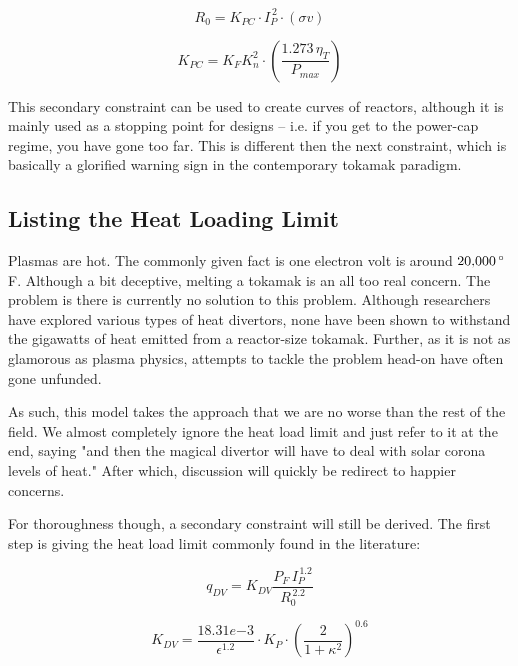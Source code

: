 \begin{equation}
	R_0 = K_{PC} \cdot I_P^{\,2} \cdot (\sigma v)
\end{equation}

\begin{equation}
	K_{PC} = K_F K_n^2 \cdot \left( \frac{ 1.273 \, \eta_T }{ P_{max} } \right)
\end{equation}

This secondary constraint can be used to create curves of reactors, although it is mainly used as a stopping point for designs -- i.e. if you get to the power-cap regime, you have gone too far. This is different then the next constraint, which is basically a glorified warning sign in the contemporary tokamak paradigm.

\subsection{Listing the Heat Loading Limit}

Plasmas are hot. The commonly given fact is one electron volt is around $20\textnormal{,}000 \, {}^\circ$F. Although a bit deceptive, melting a tokamak is an all too real concern. The problem is there is currently no solution to this problem. Although researchers have explored various types of heat divertors, none have been shown to withstand the gigawatts of heat emitted from a reactor-size tokamak. Further, as it is not as glamorous as plasma physics, attempts to tackle the problem head-on have often gone unfunded.

As such, this model takes the approach that we are no worse than the rest of the field. We almost completely ignore the heat load limit and just refer to it at the end, saying "and then the magical divertor will have to deal with solar corona levels of heat." After which, discussion will quickly be redirect to happier concerns.

For thoroughness though, a secondary constraint will still be derived. The first step is giving the heat load limit commonly found in the literature:

\begin{equation}
  q_{DV} = K_{DV}  \frac{ P_F \, I_P^{\,1.2} }{ R_0^{\,2.2} }
\end{equation}

\begin{equation}
	K_{DV} = \frac{18.31e{-3}}{\epsilon^{1.2}} \cdot K_P \cdot \left( \frac{2}{1+\kappa^2} \right) ^ {0.6}
\end{equation}

